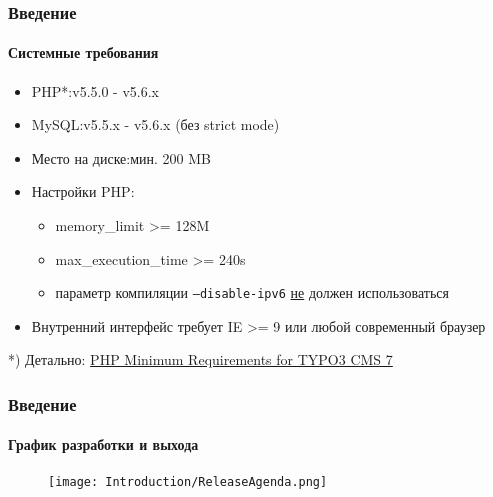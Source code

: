 
\begin{frame}[fragile]
	\frametitle{Введение}
	\framesubtitle{Системные требования}

	\begin{itemize}
		\item PHP*:\tabto{3cm}v5.5.0 - v5.6.x
		\item MySQL:\tabto{3cm}v5.5.x - v5.6.x (без strict mode)
		\item Место на диске:\tabto{3cm}мин. 200 MB
		\item Настройки PHP:

			\begin{itemize}
				\item memory\_limit >= 128M
				\item max\_execution\_time >= 240s
				\item параметр компиляции \texttt{--disable-ipv6} \underline{не} должен использоваться
			\end{itemize}

		\item Внутренний интерфейс требует IE >= 9 или любой современный браузер

	\end{itemize}

	\vspace{1cm}
	*) Детально: \href{http://typo3.org/news/article/php-minimum-requirements-for-typo3-cms-7/}{PHP Minimum Requirements for TYPO3 CMS 7}

\end{frame}


\begin{frame}[fragile]
	\frametitle{Введение}
	\framesubtitle{График разработки и выхода}

	\begin{figure}
		\texttt{[image: Introduction/ReleaseAgenda.png]}
	\end{figure}

\end{frame}

